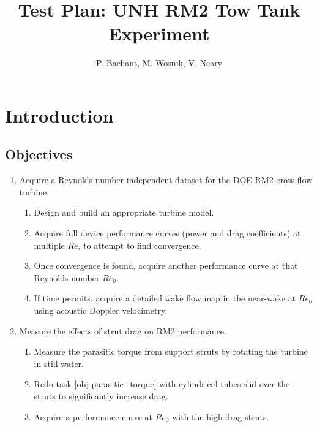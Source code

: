 \documentclass{article}
\author{P. Bachant, M. Wosnik, V. Neary}
\title{Test Plan: UNH RM2 Tow Tank Experiment}
\begin{document}
\maketitle

\section{Introduction}


\subsection{Objectives}

\begin{enumerate}

	\item Acquire a Reynolds number independent dataset for the DOE RM2 cross-flow
	turbine.

		\begin{enumerate}
			\item Design and build an appropriate turbine model.
		
			\item Acquire full device performance curves (power and drag coefficients) at
			multiple $Re$, to attempt to find convergence.
		  
			\item Once convergence is found, acquire another performance curve at that
			Reynolds number $Re_0$.
		
			\item If time permits, acquire a detailed wake flow map in the near-wake at
			$Re_0$ using acoustic Doppler velocimetry.
		\end{enumerate}
	
	\item Measure the effects of strut drag on RM2 performance.
	
	\begin{enumerate}
		\item Measure the parasitic torque from support struts by rotating the turbine
		in still water. \label{obj-parasitic_torque}
		
		\item Redo task \ref{obj-parasitic_torque} with cylindrical tubes slid over
		the struts to significantly increase drag.
		
		\item Acquire a performance curve at $Re_0$ with the high-drag struts. 
	\end{enumerate}
	
\end{enumerate}
\end{document}
